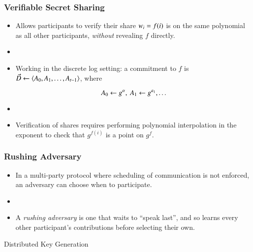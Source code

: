 \documentclass[hyperref={pdfpagelabels=true},table,dvipsnames,14pt,aspectratio=169]{beamer}
\begin{document}
\begin{frame}
  \frametitle{Verifiable Secret Sharing}

  \begin{itemize}
    \item<1-> Allows participants to verify their share $w_i = f(i)$ is on the same polynomial as all other participants,
      \emph{without} revealing $f$ directly.
    \item[]
    \item<2-> Working in the discrete log setting: a commitment to $f$ is $\vec{D} \gets \langle A_0, A_1, \ldots, A_{t-1}  \rangle$, where

      \[ A_0 \gets g^{\alpha},\ A_1 \gets g^{a_1}, \ldots \]
    \item[]
    \item<3-> Verification of shares requires performing polynomial interpolation in the exponent to check that $g^{f(i)}$ is a point on $g^f$.
  \end{itemize}
\end{frame}

\begin{frame}
  \frametitle{Rushing Adversary}

  \begin{itemize}
    \item<1-> In a multi-party protocol where scheduling of communication is not enforced, an adversary can choose when to participate.
    \item[]
    \item<2-> A \emph{rushing adversary} is one that waits to ``speak last'', and so learns every other participant's contributions before selecting their own.
  \end{itemize}
\end{frame}

\begin{frame}
  \huge
  \centering
  Distributed Key Generation
\end{frame}
\end{document}
